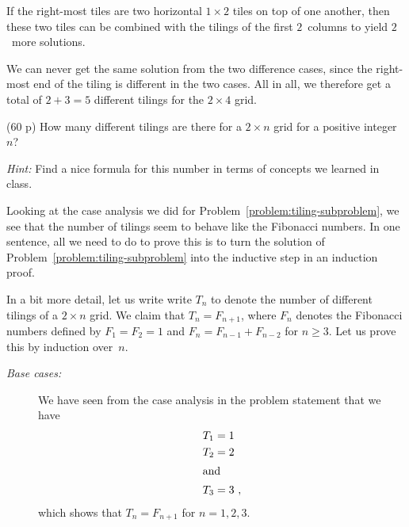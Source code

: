 \documentclass{jn-pset}
\begin{document}
\begin{problem}
\begin{solution}
  If the right-most tiles are two horizontal
  $1 \times 2$ tiles on top of one another,
  then these two tiles can be combined with the tilings
  of the first $2$~columns
  to yield $2$~more solutions.

  We can never get the same solution from the two difference cases,
  since the right-most end of the tiling is different in the two cases.
  All in all, we therefore get a total of
  $2 + 3 = 5$
  different tilings for the 
  $2 \times 4$ grid.
\end{solution}
  

  \begin{subproblem}
    {(60 p)}
    {\ignorespaces}
    How many different tilings are there for a $2 \times n$ grid
    for a positive integer~$n$?

    \smallskip
    \noindent
    \emph{Hint:}
    Find a nice formula for this number
    in terms of concepts we learned in class.
  \end{subproblem}


\begin{solution}
  Looking at the case analysis we did for
  Problem~\ref{problem:tiling-subproblem},
  we see that the number of tilings seem to behave like the Fibonacci
  numbers.
  In one sentence, 
  all we need to do to prove this is to turn the solution of
  Problem~\ref{problem:tiling-subproblem}
  into the inductive step in an induction proof.

  In a bit more detail, let us write
  write $T_n$ to denote the number of different tilings of 
  a $2 \times n$ grid.
  We claim that
  $T_n = F_{n+1}$,
  where
  $F_n$ denotes the Fibonacci numbers defined by
  $F_1 = F_2 = 1$
  and
  $F_n = F_{n-1} +  F_{n-2}$
  for
  $n \geq 3$.
  Let us prove this by induction over~$n$.
  
  \begin{description}
  \item[\emph{Base cases:}]
    We have seen from the case analysis in the problem statement that
    we have
    \begin{subequations}
      \begin{align}
        T_1 &= 1
        \\
        T_2 &= 2
        \\
        \shortintertext{and}
        T_3 &= 3
              \ ,
      \end{align}
    \end{subequations}
    which shows that
    $T_n = F_{n+1}$
    for $n=1, 2, 3$.


\end{description}
\end{solution}
\end{problem}
\end{document}
